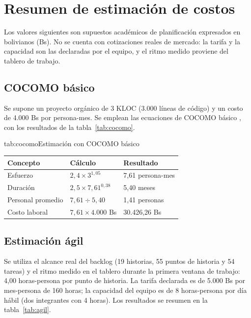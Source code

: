 \chapter{Resumen de estimación de costos}
\label{anexo:estimacion}

Los valores siguientes son supuestos académicos de planificación expresados
en bolivianos (Bs). No se cuenta con cotizaciones reales de mercado: la
tarifa y la capacidad son las declaradas por el equipo, y el ritmo medido
proviene del tablero de trabajo.

\section{COCOMO básico}

Se supone un proyecto orgánico de 3 KLOC (3.000 líneas de código) y un costo
de 4.000 Bs por persona-mes. Se emplean las ecuaciones de COCOMO básico
\parencite{boehm1981}, con los resultados de la tabla~\ref{tab:cocomo}.

\begin{tablaapa}{tab:cocomo}{Estimación con COCOMO básico}
\small
\begin{tabular}{@{}p{4.6cm}p{5.6cm}p{4.4cm}@{}}
\toprule
Concepto & Cálculo & Resultado \\
\midrule
Esfuerzo & $2{,}4 \times 3^{1{,}05}$ & 7,61 persona-mes \\
Duración & $2{,}5 \times 7{,}61^{0{,}38}$ & 5,40 meses \\
Personal promedio & $7{,}61 \div 5{,}40$ & 1,41 personas \\
Costo laboral & $7{,}61 \times 4.000$ Bs & 30.426,26 Bs \\
\bottomrule
\end{tabular}
\end{tablaapa}

\section{Estimación ágil}

Se utiliza el alcance real del backlog (19 historias, 55 puntos de historia y
54 tareas) y el ritmo medido en el tablero durante la primera ventana de
trabajo: 4,00 horas-persona por punto de historia. La tarifa declarada es de
5.000 Bs por mes-persona de 160 horas; la capacidad del equipo es de 8
horas-persona por día hábil (dos integrantes con 4 horas). Los resultados se
resumen en la tabla~\ref{tab:agil}.


